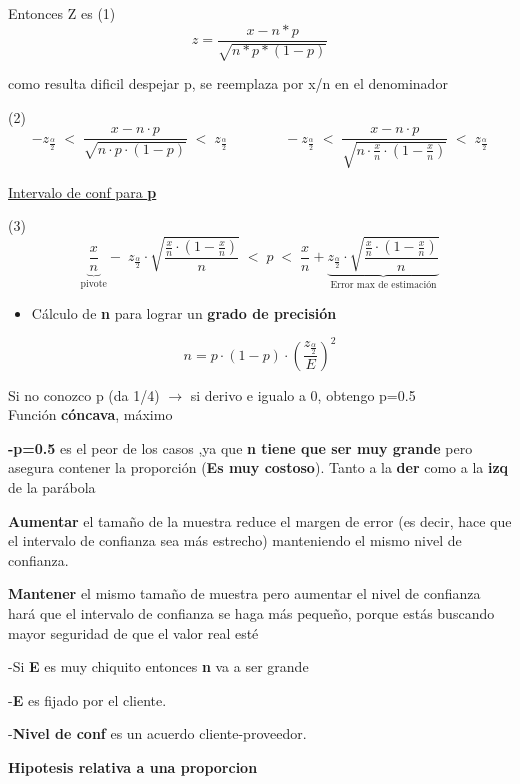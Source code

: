 \documentclass[10pt,a4paper]{article}
\begin{document}
Entonces Z es \quad (1)
\[
z = \frac{x - n{*}p}{\sqrt{n{*}p{*}(1-p)}}
\]

como resulta dificil despejar p, se reemplaza por x/n en el denominador

(2)
\[
-z_{\frac{\alpha}{2}} \;<\; \frac{x - n\cdot p}{\sqrt{n\cdot p\cdot (1-p)}} \;<\; z_{\frac{\alpha}{2}}
\qquad\qquad
-z_{\frac{\alpha}{2}} \;<\; \frac{x - n\cdot p}{\sqrt{n\cdot \frac{x}{n}\cdot \left(1-\frac{x}{n}\right)}} \;<\; z_{\frac{\alpha}{2}}
\]

\uline{Intervalo de conf para \textbf{p}}

(3)
\[
\underbrace{\frac{x}{n}}_{\text{pivote}} - \; z_{\frac{\alpha}{2}}\cdot \sqrt{\frac{\frac{x}{n}\cdot\left(1-\frac{x}{n}\right)}{n}}
\;<\; p \;<\;
\frac{x}{n} + \underbrace{z_{\frac{\alpha}{2}}\cdot \sqrt{\frac{\frac{x}{n}\cdot\left(1-\frac{x}{n}\right)}{n}}}_{\text{Error max de estimación}}
\]

\begin{itemize}[leftmargin=14pt,itemsep=1pt,topsep=1pt,parsep=0pt]
  \item Cálculo de \textbf{n} para lograr un \textbf{grado de precisión}
\end{itemize}
\[
n = p\cdot(1-p)\cdot \left(\frac{z_{\frac{\alpha}{2}}}{E}\right)^{2}
\]

Si no conozco p (da 1/4) $\rightarrow$ {\small si derivo e igualo a 0, obtengo p=0.5} \\
Función \textbf{cóncava}, máximo

\textbf{-p=0.5} es el peor de los casos ,ya que \textbf{n tiene que ser muy grande} pero asegura contener la proporción (\textbf{Es muy costoso}). Tanto a la \textbf{der} como a la \textbf{izq} de la parábola

\textbf{Aumentar} el tamaño de la muestra reduce el margen de error (es decir, hace que el intervalo de confianza sea más estrecho) manteniendo el mismo nivel de confianza.

\textbf{Mantener} el mismo tamaño de muestra pero aumentar el nivel de confianza hará que el intervalo de confianza se haga más pequeño, porque estás buscando mayor seguridad de que el valor real esté

-Si \textbf{E} es muy chiquito entonces \textbf{n} va a ser grande

-\textbf{E} es fijado por el cliente.

-\textbf{Nivel de conf} es un acuerdo cliente-proveedor.

\vspace{4pt}
\textbf{Hipotesis relativa a una proporcion}

\end{document}
